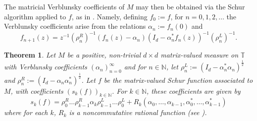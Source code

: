 \documentclass[11pt,reqno]{amsart}
\def\a{\alpha}
\def\r{\rho}
\def\NN{\mathbb{N}}
\def\TT{\mathbb{T}}
\newtheorem{theorem}{Theorem}[section]
\theoremstyle{definition}
\numberwithin{equation}{section}
\begin{document}
The matricial Verblunsky coefficients of \(M\) may then be obtained via the Schur algorithm applied to \(f\), as in \cite[Theorem 3.19]{DPS08}. Namely, defining \(f_0 := f\), for \(n = 0, 1, 2, \ldots\) the Verblunsky coefficients arise from the relations \(\a_n := f_n(0)\) and
\[
    f_{n+1}(z) = z^{-1} (\r_n^R)^{-1} (f_n(z) - \a_n)(I_d - \a_n^* f_n(z))^{-1} (\r_n^L)^{-1}.
\]
\begin{theorem}
\label{thm:MatrixSchurRec}
    Let \(M\) be a positive, non-trivial $d \times d$ matrix-valued measure on \(\TT\) with Verblunsky coefficients \((\a_n)_{n=0}^{\infty}\) and for \(n \in \NN\), let \(\r_n^L := (I_d - \a_n^* \a_n)^{\frac12}\) and \(\r_n^R := (I_d - \a_n \a_n^*)^{\frac12}\). Let \(f\) be the matrix-valued Schur function associated to \(M\), with coefficients \((s_k(f))_{k\in\NN}\). For \(k \in \NN\), these coefficients are given by
    \[
        s_k(f) = \r_0^R \ldots \r_{k-1}^R \a_k \r_{k-1}^L \ldots \r_0^L + R_k(\a_0, \ldots, \a_{k-1}, \a_0^*, \ldots, \a_{k-1}^*)
    \]
    where for each \(k\), \(R_k\) is a noncommutative rational function (see \cite{PV21}).
\end{theorem}
\end{document}

